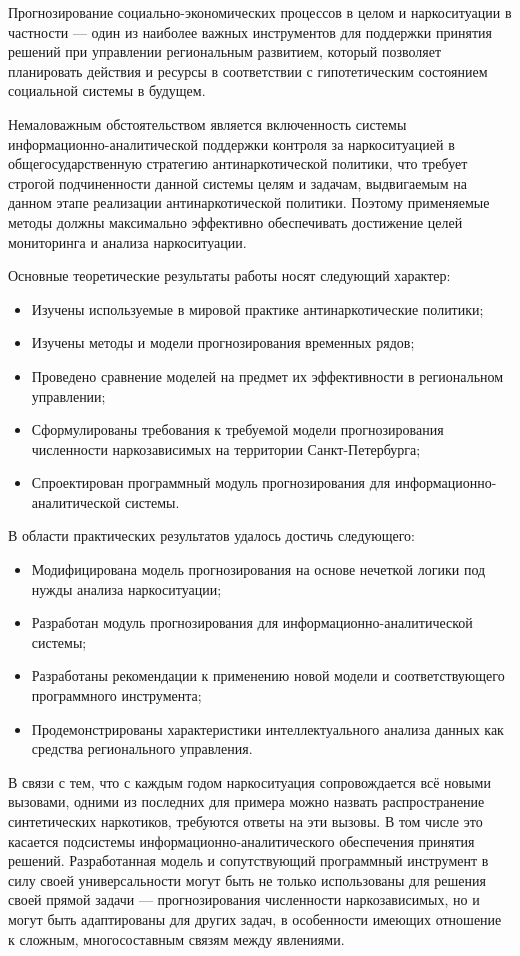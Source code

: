 Прогнозирование социально-экономических процессов в целом и наркоситуации в
частности --- один из наиболее важных инструментов для поддержки принятия
решений при управлении региональным развитием, который позволяет планировать
действия и ресурсы  в соответствии с гипотетическим состоянием социальной
системы в будущем.

Немаловажным обстоятельством является включенность системы
информационно-аналитической поддержки контроля за наркоситуацией в
общегосударственную стратегию антинаркотической политики, что требует строгой
подчиненности данной системы целям и задачам, выдвигаемым на данном этапе
реализации антинаркотической политики. Поэтому применяемые методы должны
максимально эффективно обеспечивать достижение целей мониторинга и анализа
наркоситуации.

Основные теоретические результаты работы носят следующий характер: 
\begin{itemize}
\item Изучены используемые в мировой практике антинаркотические политики;
\item Изучены методы и модели прогнозирования временных рядов;
\item Проведено сравнение моделей на предмет их эффективности в региональном
управлении;
\item Сформулированы требования к требуемой модели прогнозирования численности
наркозависимых на территории Санкт-Петербурга;
\item Спроектирован программный модуль прогнозирования для
информационно-аналитической системы.
\end{itemize}

В области практических результатов удалось достичь следующего:
\begin{itemize}
\item Модифицирована модель прогнозирования на основе нечеткой логики под нужды
анализа наркоситуации;
\item Разработан модуль прогнозирования для информационно-аналитической системы;
\item Разработаны рекомендации к применению новой модели и соответствующего
    программного инструмента;
\item Продемонстрированы характеристики интеллектуального анализа данных как
средства регионального управления.
\end{itemize}

В связи с тем, что с каждым годом наркоситуация сопровождается всё новыми
вызовами, одними из последних для примера можно назвать распространение
синтетических наркотиков, требуются ответы на эти вызовы. В том числе это
касается подсистемы информационно-аналитического обеспечения принятия решений.
Разработанная модель и сопутствующий  программный инструмент в силу своей
универсальности могут быть не только использованы для решения своей прямой
задачи --- прогнозирования численности наркозависимых, но и могут быть
адаптированы для других задач, в особенности имеющих отношение к сложным,
многосоставным связям между явлениями.

